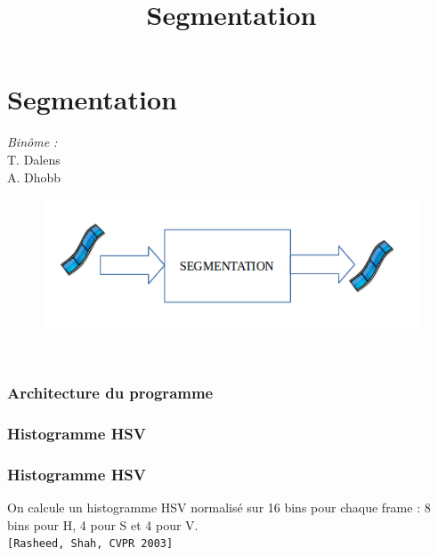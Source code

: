  \section{Segmentation}
 \begin{frame}
 \title{Segmentation}
 \titlepage

    \begin{minipage}{0.3\textwidth}
    \begin{flushleft} \large
    \emph{Binôme :}\\
    T. Dalens\\
    A. Dhobb
    \end{flushleft}
    \end{minipage}
    \begin{minipage}{0.5\textwidth}
    \begin{flushright} \large
    \begin{figure}
    \includegraphics[width=1.4\textwidth]{Fig/architectureSectionSegmentation.png}
    \end{figure}
    \end{flushright}
    \end{minipage}\\[3cm]
    
 \end{frame}
 
 
\begin{frame}
  \frametitle{Architecture du programme}
  
\end{frame} 
 
 


 \begin{frame}
 \frametitle{Histogramme HSV}
 \end{frame}
 
 \begin{frame}
 \frametitle{Histogramme HSV}
 On calcule un histogramme HSV normalisé sur 16 bins pour chaque frame : 8 bins pour H, 4 pour S et 4 pour V.\\
 \vspace{1cm}
 \verb![Rasheed, Shah, CVPR 2003]!\\
 \end{frame}
 
